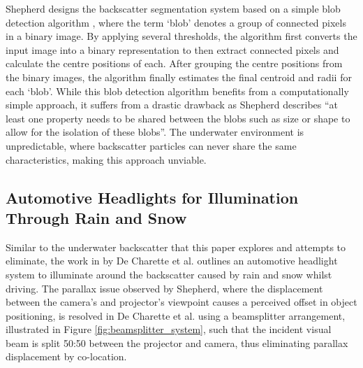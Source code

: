 Shepherd designs the backscatter segmentation system based on a simple blob detection algorithm \cite{opencvOpenCVCvSimpleBlobDetector}, where the term `blob' denotes a group of connected pixels in a binary image. By applying several thresholds, the algorithm first converts the input image into a binary representation to then extract connected pixels and calculate the centre positions of each. After grouping the centre positions from the binary images, the algorithm finally estimates the final centroid and radii for each `blob'. While this blob detection algorithm benefits from a computationally simple approach, it suffers from a drastic drawback as Shepherd describes ``at least one property needs to be shared between the blobs such as size or shape to allow for the isolation of these blobs''. The underwater environment is unpredictable, where backscatter particles can never share the same characteristics, making this approach unviable.

\subsection{Automotive Headlights for Illumination Through Rain and Snow}
\label{autolights}

Similar to the underwater backscatter that this paper explores and attempts to eliminate, the work in \cite{decharetteFastReactiveControl2012} by De Charette et al. outlines an automotive headlight system to illuminate around the backscatter caused by rain and snow whilst driving. The parallax issue observed by Shepherd, where the displacement between the camera's and projector's viewpoint causes a perceived offset in object positioning, is resolved in De Charette et al. using a beamsplitter arrangement, illustrated in Figure \ref{fig:beamsplitter_system}, such that the incident visual beam is split 50:50 between the projector and camera, thus eliminating parallax displacement by co-location.

